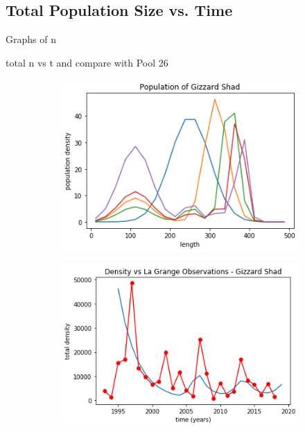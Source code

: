 \documentclass[11pt,oneside]{amsart}
\theoremstyle{definition}
\begin{document}
\subsection{Total Population Size vs. Time}
Graphs of n

total n vs t and compare with Pool 26

\begin{figure}
\centering
\begin{subfigure}[b]{.32\textwidth}
  \includegraphics[width=\textwidth]{figures/popdensity.png}
     \caption{}
  \label{fig:popdensity}
\end{subfigure}
\begin{subfigure}[b]{.32\textwidth}
   \includegraphics[width=\textwidth]{figures/lagrange.png}
     \caption{}
\label{fig:lagrange}
\end{subfigure}

\end{figure}
\end{document}
